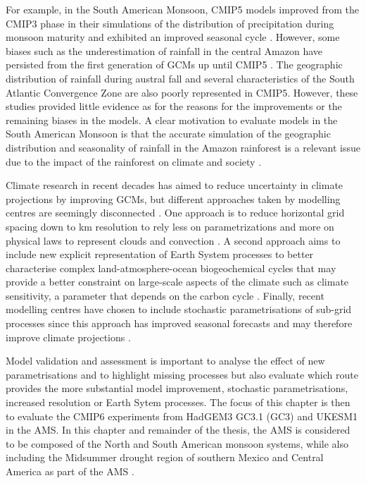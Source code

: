 For example, in the South American Monsoon, CMIP5 models improved from the CMIP3 phase in their simulations of the distribution of precipitation during monsoon maturity and exhibited an improved seasonal cycle \citep{jones2013,yin2013}. However, some biases such as the underestimation of rainfall in the central Amazon have persisted from the first generation of GCMs up until CMIP5 \citep{li2006,yin2013}. The geographic distribution of rainfall during  austral fall and several characteristics of the South Atlantic Convergence Zone are also poorly represented in CMIP5. However, these studies provided little evidence as for the reasons for the improvements or the remaining biases in the models. 
A clear motivation to evaluate models in the South American Monsoon is that the accurate simulation of the geographic distribution and seasonality of rainfall in the Amazon rainforest is a relevant issue due to the impact of the rainforest on climate and society \citep[e.g.][]{li2006,Malhi20610,yin2013}.

Climate research in recent decades has aimed to reduce uncertainty in climate projections by improving GCMs, but different approaches taken by modelling centres are seemingly disconnected \citep{jakob2014}. One approach is to reduce horizontal grid spacing down to km resolution to rely less on parametrizations and more on physical laws to represent clouds and convection \citep{palmer2019}. A second approach aims to include new explicit representation of Earth System processes to better characterise complex land-atmosphere-ocean biogeochemical cycles that may provide a better constraint on large-scale aspects of the climate such as climate sensitivity, a parameter that depends on the carbon cycle \citep{marotzke2017,sellar2019,andrews2019}. Finally, recent modelling centres have chosen to include  stochastic  parametrisations of sub-grid processes since this approach has improved seasonal forecasts and may therefore improve climate projections \citep{palmer2019st}. 

Model validation and assessment is important to analyse the effect of new parametrisations and to highlight missing processes but also evaluate which route provides the more substantial model improvement, stochastic parametrisations, increased resolution or Earth Sytem processes.
The focus of this chapter is then to evaluate the CMIP6 experiments from HadGEM3 GC3.1 (GC3) and UKESM1 in the AMS. In this chapter and remainder of the thesis, the AMS is considered to be composed of the North and South American monsoon systems, while also including the Midsummer drought region of southern Mexico and Central America as part of the AMS \citep[as in e.g.][]{vera2006,pascale2019}.

